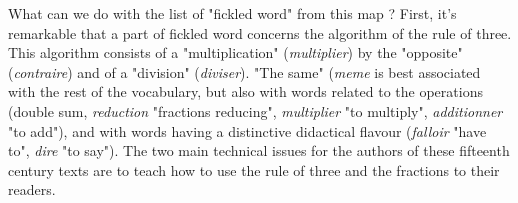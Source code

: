 \documentclass[preprint]{elsarticle}
\begin{document}
 
What can we do with the list of "fickled word" from this map ? First, it's remarkable that a part of fickled word concerns the algorithm of the rule of three. This algorithm  consists of a "multiplication" (\textit{multiplier}) by the "opposite" (\textit{contraire}) and of a "division" (\textit{diviser}). "The same" (\textit{meme} is best associated with the rest of the vocabulary, but also with words related to the operations (double sum, \textit{reduction} "fractions reducing", \textit{multiplier} "to multiply", \textit{additionner} "to add"), and with words having a distinctive didactical flavour (\textit{falloir} "have to", \textit{dire} "to say"). The two main technical issues for the authors of these fifteenth century texts are to teach how to use the rule of three and the fractions to their readers.  
 
 
\setlength{\tabcolsep}{1mm}
\setlength{\arrayrulewidth}{1pt}
\end{document}

